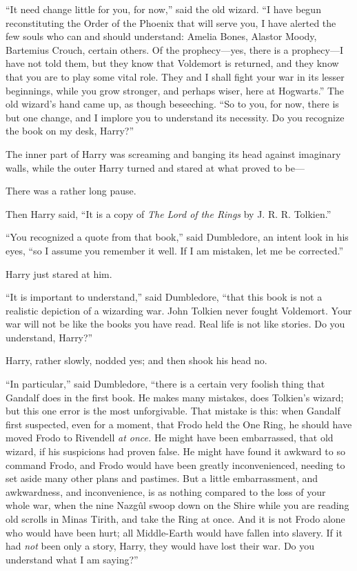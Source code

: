 “It need change little for you, for now,” said the old wizard. “I have begun
reconstituting the Order of the Phoenix that will serve you, I have alerted the
few souls who can and should understand: Amelia Bones, Alastor Moody, Bartemius
Crouch, certain others. Of the prophecy—yes, there is a prophecy—I have not
told them, but they know that Voldemort is returned, and they know that you are
to play some vital role. They and I shall fight your war in its lesser
beginnings, while you grow stronger, and perhaps wiser, here at Hogwarts.” The
old wizard’s hand came up, as though beseeching. “So to you, for now, there is
but one change, and I implore you to understand its necessity. Do you recognize
the book on my desk, Harry?”

The inner part of Harry was screaming and banging its head against imaginary
walls, while the outer Harry turned and stared at what proved to be—

There was a rather long pause.

Then Harry said, “It is a copy of \emph{The Lord of the Rings} by J. R. R.
Tolkien.”

“You recognized a quote from that book,” said Dumbledore, an intent look in his
eyes, “so I assume you remember it well. If I am mistaken, let me be corrected.”

Harry just stared at him.

“It is important to understand,” said Dumbledore, “that this book is not a
realistic depiction of a wizarding war. John Tolkien never fought Voldemort.
Your war will not be like the books you have read. Real life is not like
stories. Do you understand, Harry?”

Harry, rather slowly, nodded yes; and then shook his head no.

“In particular,” said Dumbledore, “there is a certain very foolish thing that
Gandalf does in the first book. He makes many mistakes, does Tolkien’s wizard;
but this one error is the most unforgivable. That mistake is this: when Gandalf
first suspected, even for a moment, that Frodo held the One Ring, he should
have moved Frodo to Rivendell \emph{at once.} He might have been embarrassed,
that old wizard, if his suspicions had proven false. He might have found it
awkward to so command Frodo, and Frodo would have been greatly inconvenienced,
needing to set aside many other plans and pastimes. But a little embarrassment,
and awkwardness, and inconvenience, is as nothing compared to the loss of your
whole war, when the nine Nazgûl swoop down on the Shire while you are reading
old scrolls in Minas Tirith, and take the Ring at once. And it is not Frodo
alone who would have been hurt; all Middle-Earth would have fallen into
slavery. If it had \emph{not} been only a story, Harry, they would have lost
their war. Do you understand what I am saying?”

